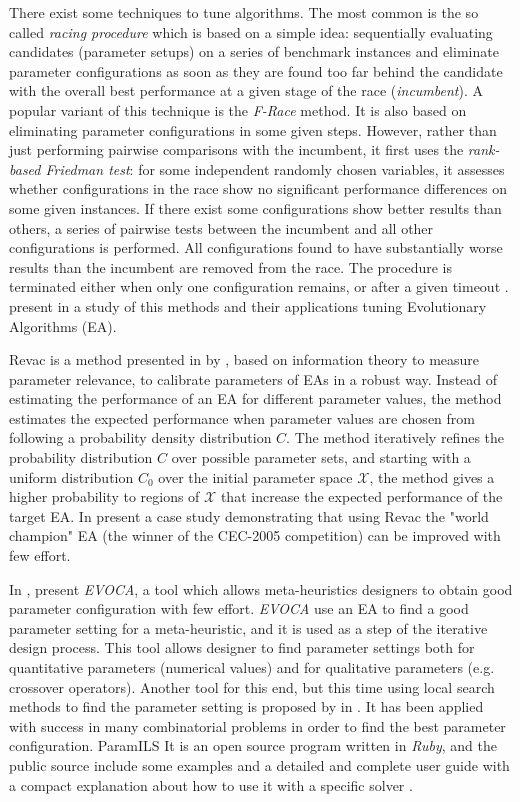 There exist some techniques to tune algorithms. The most common is the so called {\it racing procedure} which is based on a simple idea: sequentially evaluating candidates (parameter setups) on a series of benchmark instances and eliminate parameter configurations as soon as they are found too far behind the candidate with the overall best performance at a given stage of the race (\textit{incumbent}). A popular variant of this technique is the \textit{F-Race} method. It is also based on eliminating parameter configurations in some given steps. However, rather than just performing pairwise comparisons with the incumbent, it first uses the \textit{rank-based Friedman test}: for some independent randomly chosen variables, it assesses whether configurations in the race show no significant performance differences on some given instances. If there exist some configurations show better results than others, a series of pairwise tests between the incumbent and all other configurations is performed. All configurations found to have substantially worse results than the incumbent are removed from the race. The procedure is terminated either when only one configuration remains, or after a given timeout \cite{Hoos2012}.  present in \cite{A.E.Eiben2012} a study of this methods and their applications tuning Evolutionary Algorithms (EA).

{\sc Revac} is a method presented in \cite{Nannen2007} by , based on information theory to measure parameter relevance, to calibrate parameters of EAs in a robust way. Instead of estimating the performance of an EA for different parameter values, the method estimates the expected performance when parameter values are chosen from following a probability density distribution $C$. The method iteratively refines the probability distribution $C$ over possible parameter sets, and starting with a uniform distribution $C_0$ over the initial parameter space $\mathcal{X}$, the method gives a higher probability to regions of $\mathcal{X}$ that increase the expected performance of the target EA. In \cite{Smit2010}  present a case study demonstrating that using {\sc Revac} the "world champion" EA (the winner of the CEC-2005 competition) can be improved with few effort.

In \cite{Riff2013},  present \textit{EVOCA}, a tool which allows meta-heuristics designers to obtain good parameter configuration with few effort. \textit{EVOCA} use an EA to find a good parameter setting for a meta-heuristic, and it is used as a step of the iterative design process. This tool allows designer to find parameter settings both for quantitative parameters (numerical values) and for qualitative parameters (e.g. crossover operators). Another tool for this end, but this time using local search methods to find the parameter setting is proposed by  in \cite{Hutter2009}. It has been applied with success in many combinatorial problems in order to find the best parameter configuration. {\sc ParamILS} It is an open source program written in {\it Ruby}, and the public source include some examples and a detailed and complete user guide with a compact explanation about how to use it with a specific solver \cite{Hutter2008}.


